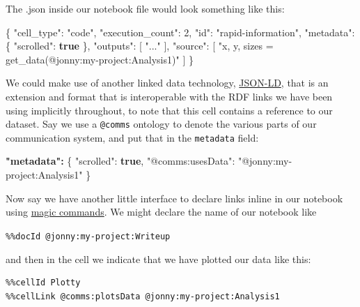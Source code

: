 \documentclass[10pt]{tufte-book}
\newenvironment{Shaded}{}{}
\newcommand{\DataTypeTok}[1]{\textcolor[rgb]{0.56,0.13,0.00}{#1}}
\newcommand{\DecValTok}[1]{\textcolor[rgb]{0.25,0.63,0.44}{#1}}
\newcommand{\ErrorTok}[1]{\textcolor[rgb]{1.00,0.00,0.00}{\textbf{#1}}}
\newcommand{\FunctionTok}[1]{\textcolor[rgb]{0.02,0.16,0.49}{#1}}
\newcommand{\KeywordTok}[1]{\textcolor[rgb]{0.00,0.44,0.13}{\textbf{#1}}}
\newcommand{\OtherTok}[1]{\textcolor[rgb]{0.00,0.44,0.13}{#1}}
\newcommand{\StringTok}[1]{\textcolor[rgb]{0.25,0.44,0.63}{#1}}
\begin{document}
The .json inside our notebook file would look something like this:

\begin{Shaded}
\begin{Highlighting}[]
\FunctionTok{\{}
   \DataTypeTok{"cell\_type"}\FunctionTok{:} \StringTok{"code"}\FunctionTok{,}
   \DataTypeTok{"execution\_count"}\FunctionTok{:} \DecValTok{2}\FunctionTok{,}
   \DataTypeTok{"id"}\FunctionTok{:} \StringTok{"rapid{-}information"}\FunctionTok{,}
   \DataTypeTok{"metadata"}\FunctionTok{:} \FunctionTok{\{}
    \DataTypeTok{"scrolled"}\FunctionTok{:} \KeywordTok{true}
   \FunctionTok{\},}
   \DataTypeTok{"outputs"}\FunctionTok{:} \OtherTok{[}
    \StringTok{"..."}
   \OtherTok{]}\FunctionTok{,}
   \DataTypeTok{"source"}\FunctionTok{:} \OtherTok{[}
    \StringTok{"x, y, sizes = get\_data(\textquotesingle{}@jonny:my{-}project:Analysis1\textquotesingle{})"}
   \OtherTok{]}
\FunctionTok{\}}
\end{Highlighting}
\end{Shaded}

We could make use of another linked data technology,
\href{https://json-ld.org/}{JSON-LD}, that is an extension and format
that is interoperable with the RDF links we have been using implicitly
throughout, to note that this cell contains a reference to our dataset.
Say we use a \texttt{@comms} ontology to denote the various parts of our
communication system, and put that in the \texttt{metadata} field:

\begin{Shaded}
\begin{Highlighting}[]
\ErrorTok{"metadata":} \FunctionTok{\{}
  \DataTypeTok{"scrolled"}\FunctionTok{:} \KeywordTok{true}\FunctionTok{,}
  \DataTypeTok{"@comms:usesData"}\FunctionTok{:} \StringTok{"@jonny:my{-}project:Analysis1"}
\FunctionTok{\}}
\end{Highlighting}
\end{Shaded}

Now say we have another little interface to declare links inline in our
notebook using
\href{https://ipython.readthedocs.io/en/stable/interactive/magics.html}{magic
commands}. We might declare the name of our notebook like

\texttt{\%\%docId\ @jonny:my-project:Writeup}

and then in the cell we indicate that we have plotted our data like
this:

\begin{verbatim}
%%cellId Plotty
%%cellLink @comms:plotsData @jonny:my-project:Analysis1
\end{verbatim}
\end{document}
